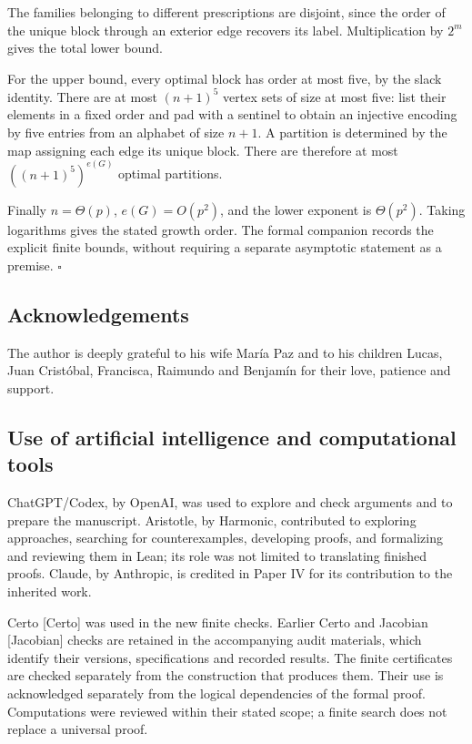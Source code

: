 \documentclass[english,11pt,a4paper]{article}
\begin{document}
The families belonging to different prescriptions are disjoint, since
the order of the unique block through an exterior edge recovers its
label. Multiplication by \(2^m\) gives the total lower bound.

For the upper bound, every optimal block has order at most five, by the
slack identity. There are at most \((n+1)^5\) vertex sets of size at
most five: list their elements in a fixed order and pad with a sentinel
to obtain an injective encoding by five entries from an alphabet of size
\(n+1\). A partition is determined by the map assigning each edge its
unique block. There are therefore at most \(((n+1)^5)^{e(G)}\) optimal
partitions.

Finally \(n=\Theta(p)\), \(e(G)=O(p^2)\), and the lower exponent is
\(\Theta(p^2)\). Taking logarithms gives the stated growth order. The
formal companion records the explicit finite bounds, without requiring a
separate asymptotic statement as a premise. \(\square\)

\subsection{Acknowledgements}\label{acknowledgements}

The author is deeply grateful to his wife María Paz and to his children
Lucas, Juan Cristóbal, Francisca, Raimundo and Benjamín for their love,
patience and support.

\subsection{Use of artificial intelligence and computational
tools}\label{use-of-artificial-intelligence-and-computational-tools}

ChatGPT/Codex, by OpenAI, was used to explore and check arguments and to
prepare the manuscript. Aristotle, by Harmonic, contributed to exploring
approaches, searching for counterexamples, developing proofs, and
formalizing and reviewing them in Lean; its role was not limited to
translating finished proofs. Claude, by Anthropic, is credited in Paper
IV for its contribution to the inherited work.

Certo {[}Certo{]} was used in the new finite checks. Earlier Certo and
Jacobian {[}Jacobian{]} checks are retained in the accompanying audit
materials, which identify their versions, specifications and recorded
results. The finite certificates are checked separately from the
construction that produces them. Their use is acknowledged separately
from the logical dependencies of the formal proof. Computations were
reviewed within their stated scope; a finite search does not replace a
universal proof.
\end{document}
